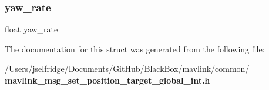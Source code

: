 \subsubsection{yaw\+\_\+rate}
{\footnotesize\ttfamily float yaw\+\_\+rate}



The documentation for this struct was generated from the following file\+:\begin{DoxyCompactItemize}
\item 
/\+Users/jselfridge/\+Documents/\+Git\+Hub/\+Black\+Box/mavlink/common/\textbf{ mavlink\+\_\+msg\+\_\+set\+\_\+position\+\_\+target\+\_\+global\+\_\+int.\+h}\end{DoxyCompactItemize}
